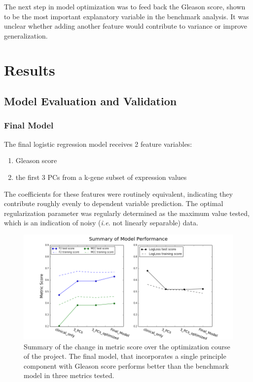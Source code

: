 \documentclass[final]{article}
\begin{document}
The next step in model optimization was to feed back the Gleason score, shown to
be the most important explanatory variable in the benchmark analysis.  It was
unclear whether adding another feature would contribute to variance or improve
generalization.

\section{Results}

\subsection{Model Evaluation and Validation}

\subsubsection{Final Model}

The final logistic regression model receives 2 feature variables:

\begin{enumerate}
\item Gleason score
\item the first 3 PCs from a k-gene subset of expression values
\end{enumerate}

The coefficients for these features were routinely equivalent, indicating they
contribute roughly evenly to dependent variable prediction.  The optimal
regularization parameter was regularly determined as the maximum value tested,
which is an indication of noisy (\textit{i.e.} not linearly separable) data.

\begin{figure}[h]
  \centering
  \includegraphics[width=\textwidth]{FF}
  \caption{Summary of the change in metric score over the optimization course of the project.  The final model, that incorporates a single principle component with Gleason score performs better than the benchmark model in three metrics tested.\label{fig:FM}}
\end{figure}
\end{document}
